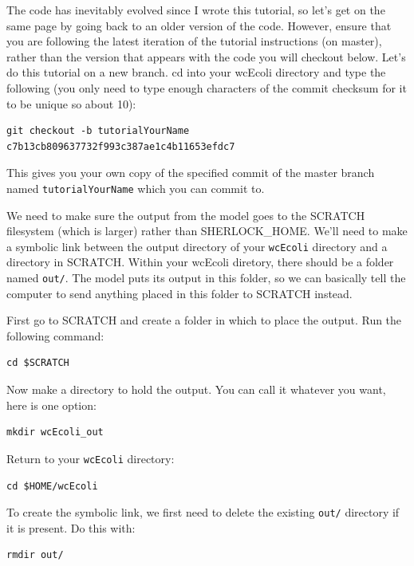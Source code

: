 \documentclass[12pt]{article}
\begin{document}
The code has inevitably evolved since I wrote this tutorial, so let's get on the same page by going back to an older version of the code. However, ensure that you are following the latest iteration of the tutorial instructions (on master), rather than the version that appears with the code you will checkout below. Let's do this tutorial on a new branch. cd into your wcEcoli directory and type the following (you only need to type enough characters of the commit checksum for it to be unique so about 10):

\lstset{language=bash}
\begin{lstlisting}
git checkout -b tutorialYourName c7b13cb809637732f993c387ae1c4b11653efdc7
\end{lstlisting}

This gives you your own copy of the specified commit of the master branch named \texttt{tutorialYourName} which you can commit to.

We need to make sure the output from the model goes to the SCRATCH filesystem (which is larger) rather than SHERLOCK\_HOME. We'll need to make a symbolic link between the output directory of your \texttt{wcEcoli} directory and a directory in SCRATCH. Within your wcEcoli diretory, there should be a folder named \texttt{out/}. The model puts its output in this folder, so we can basically tell the computer to send anything placed in this folder to SCRATCH instead.

First go to SCRATCH and create a folder in which to place the output. Run the following command:

\lstset{language=bash}
\begin{lstlisting}
cd $SCRATCH
\end{lstlisting}

Now make a directory to hold the output. You can call it whatever you want, here is one option:

\lstset{language=bash}
\begin{lstlisting}
mkdir wcEcoli_out
\end{lstlisting}

Return to your \texttt{wcEcoli} directory:

\lstset{language=bash}
\begin{lstlisting}
cd $HOME/wcEcoli
\end{lstlisting}

To create the symbolic link, we first need to delete the existing \texttt{out/} directory if it is present. Do this with:

\lstset{language=bash}
\begin{lstlisting}
rmdir out/
\end{lstlisting}
\end{document}
